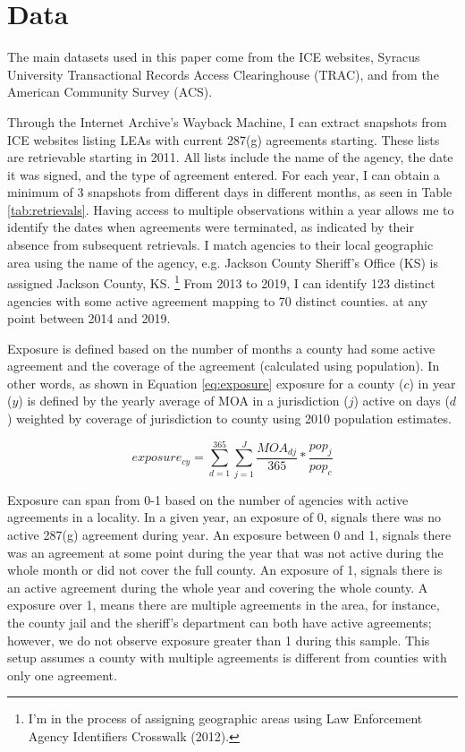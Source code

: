 \documentclass{article}
\begin{document}
\section{Data}
The main datasets used in this paper come from the ICE websites,  Syracus University Transactional Records Access Clearinghouse (TRAC), and from the American Community Survey (ACS). 

Through the Internet Archive's Wayback Machine, I can extract snapshots from ICE websites listing LEAs with current 287(g) agreements starting. These lists are retrievable starting in 2011. All lists include the name of the agency, the date it was signed, and the type of agreement entered. For each year, I can obtain a minimum of 3 snapshots from different days in different months, as seen in Table \ref{tab:retrievals}. Having access to multiple observations within a year allows me to identify the dates when agreements were terminated, as indicated by their absence from subsequent retrievals. I match agencies to their local geographic area using the name of the agency, e.g. Jackson County Sheriff’s Office (KS) is assigned Jackson County, KS. \footnote{I'm in the process of assigning geographic areas using Law Enforcement Agency Identifiers Crosswalk (2012).} From 2013 to 2019, I can identify 123 distinct agencies with some active agreement mapping to 70 distinct counties. at any point between 2014 and 2019. 

Exposure is defined based on the number of months a county had some active agreement and the coverage of the agreement (calculated using population). In other words, as shown in Equation \ref{eq:exposure} exposure for a county ($c$) in year ($y$) is defined by the yearly average of MOA in a jurisdiction ($j$) active on days ($d$) weighted by coverage of jurisdiction to county using 2010 population estimates.

\begin{equation}
\label{eq:exposure}
    exposure_{cy} = \sum_{d=1}^{365} \sum_{j=1} ^{J} \frac{MOA_{dj}}{365} * \frac{pop_{j}}{pop_{c}}
\end{equation}

Exposure can span from 0-1 based on the number of agencies with active agreements in a locality. In a given year, an exposure of 0, signals there was no active 287(g) agreement during year. An exposure between 0 and 1, signals there was an agreement at some point during the year that was not active during the whole month or did not cover the full county. An exposure of 1, signals there is an active agreement during the whole year and covering the whole county. A exposure over 1, means there are multiple agreements in the area, for instance, the county jail and the sheriff's department can both have active agreements; however, we do not observe exposure greater than 1 during this sample. This setup assumes a county with multiple agreements is different from counties with only one agreement.
\end{document}

